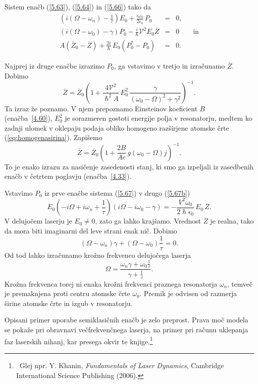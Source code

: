 Sistem enačb (\ref{5.63}), (\ref{5.64}) in (\ref{5.66}) 
tako da 
\begin{eqnarray}
\left(i\left(\Omega - \omega_n\right)-\frac{1}{\tau}\right) E_{0}+\frac{i\omega _{0}}
{2\epsilon _{0}}\,P_{0} &=&0,  \label{5.67} \\
\left(i\left(\Omega-\omega_{0}\right)-\gamma\right)P_{0}-\frac{i}{\hslash}\mathcal{V}^{2}
E_{0}\overline{Z} &=&0 \qquad \mathrm{in}\label{5.67b}\\
A\left(\overline{Z}_{0}-\overline{Z}\right)+\frac{2i}{\hslash }\,E_{0}\left(P_{0}^{*}-P_{0}\right) &=&0.
\end{eqnarray}

Najprej iz druge enačbe izrazimo $P_0$, ga vstavimo v tretjo in izračunamo $\overline{Z}$. Dobimo
\begin{equation}  
\label{5.68}
\overline{Z}=\overline{Z}_0\left(1+\frac{4\mathcal{V}^2}{\hslash^2 A}\,E_0^2\, \frac{\gamma}
{\left(\omega_0-\Omega\right)^2+\gamma^2}\right)^{-1}.
\end{equation}
Ta izraz že poznamo. V njem prepoznamo Einsteinov
koeficient $B$ (enačba~\ref{4.60}),
$E_0^2$ je sorazmeren gostoti energije polja v resonatorju, medtem ko 
zadnji ulomek v oklepaju podaja obliko homogeno razširjene atomske
črte (\ref{eq:homogenasirina}). Zapišemo
\begin{equation}  
\label{5.69}
\overline{Z}=\overline{Z}_0\left(1+\frac{2B}{Ac}\,g\left(\omega_0- \Omega\right)j\right)^{-1}.
\end{equation}
To je enako izrazu za nasičenje zasedenosti stanj, ki smo ga
izpeljali iz zasedbenih enačb v četrtem poglavju (enačba~\ref{4.33}).

Vstavimo $P_0$ iz prve enačbe sistema (\ref{5.67}) v drugo (\ref{5.67b})
\begin{equation}  
\label{5.70}
E_0\left(-i\Omega+i\omega_n+\frac{1}{\tau}\right) \left(i\Omega- i\omega_0
-\gamma\right)=-\frac{V^2 \omega_0}{2\hslash\epsilon_0}\,E_0\,\overline{Z}.
\end{equation}
V delujočem laserju je $E_0\ne 0$, zato ga lahko krajšamo. Vrednost $\overline{Z}$ je
realna, tako da mora biti imaginarni del leve strani enak nič. Dobimo
\begin{equation}  
\label{5.71}
\left(\Omega- \omega_n\right)\gamma+\left(\Omega- \omega_0\right)\frac{1}{\tau} = 0.
\end{equation}
Od tod lahko izračunamo krožno frekvenco delujočega laserja 
\begin{equation}  \label{5.72}
\Omega=\frac{\omega_n\gamma+ \omega_0\frac{1}{\tau}}{\gamma + \frac{1}{\tau}}.
\end{equation}
Krožna frekvenca torej ni enaka krožni frekvenci praznega resonatorja $\omega_n$,
temveč je premaknjena proti centru atomske črte $\omega_0$. Premik je
odvisen od razmerja širine atomske črte in izgub v resonatorju.

Opisani primer uporabe semiklasičnih enačb je zelo preprost. Prava moč
modela se pokaže pri obravnavi večfrekvenčnega laserja, na primer pri
računu uklepanja faz laserskih nihanj, kar presega okvir te 
knjige.\footnote{~Glej npr. Y. Khanin, {\it Fundamentals of Laser Dynamics}, Cambridge International Science
Publishing (2006).} 

